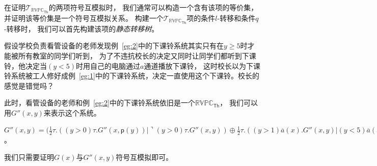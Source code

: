 在证明$\mathcal{T}_{\mathbb{RVPC}_{\mathsf{Th}}}$的两项符号互模拟时，
我们通常可以构造一个含有该项的等价集，并证明该等价集是一个符号互模拟关系。
构建一个$\mathcal{T}_{\mathbb{RVPC}_{\mathsf{Th}}}$项的条件$l$-转移和条件$q$-转移时，
我们可以首先构建该项的\textit{静态转移树}。

\begin{example}\label{eg:5}
   假设学校负责看管设备的老师发现例~\ref{eg:2}中的下课铃系统其实只有在$y\geq 5$时才能被所有教室的同学们听到，
   为了不违抗校长的决定又同时让同学们都听到下课铃，他决定当$(y<5)$时用自己的电脑通过$a$通道播放下课铃，
   这时校长以为下课铃系统被工人修好成例~\ref{eg:1}中的下课铃系统，决定一直使用这个下课铃。校长的感觉是错觉吗？

   此时，看管设备的老师和例~\ref{eg:2}中的下课铃系统依旧是一个$\mathbb{RVPC}_{\mathsf{Th}}$，
   我们可以用$G''(x,y)$来表示这个系统。

   $G''(x,y) = (\frac{1}{2}\tau.((y>0)\tau.G''(x,\mathsf{p}(y))|\urcorner (y>0)\tau.G''(x,y))\oplus \frac{1}{2}\tau.((y>1)\overline{a}(x).G''(x,y)|(y<5)\overline{a}(x).G''(x,y))$。

   我们只需要证明$G(x)$与$G''(x,y)$符号互模拟即可。
\end{example}
